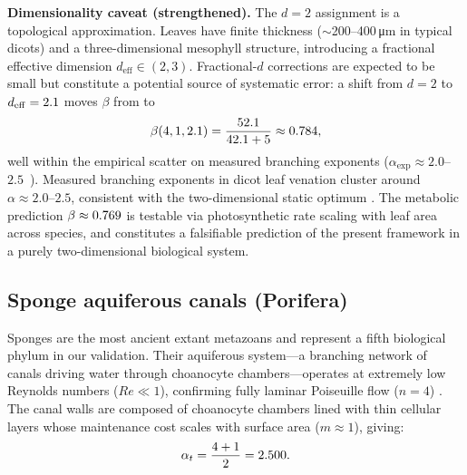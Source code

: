\documentclass[11pt,a4paper]{article}
\theoremstyle{remark}
\begin{document}
\noindent\textbf{Dimensionality caveat (strengthened).} The $d = 2$ assignment is a
topological approximation. Leaves have finite thickness
($\sim$200--400\,\si{\micro\metre} in typical dicots) and a
three-dimensional mesophyll structure, introducing a fractional effective
dimension $d_{\mathrm{eff}} \in (2, 3)$. Fractional-$d$ corrections are
expected to be small but constitute a potential source of systematic error:
a shift from $d = 2$ to $d_{\mathrm{eff}} = 2.1{}$ moves $\beta$ from
\betaLeaf{} to
\begin{equation}
\beta(4, 1, 2.1{}) = \frac{52.1{}}{42.1{} + 5}
\approx 0.784{},
\end{equation}
well within the empirical scatter on measured branching exponents
($\alpha_{\exp} \approx 2.0$--$2.5$~\cite{mcculloh2003}).
Measured branching exponents in dicot leaf venation cluster around $\alpha
\approx 2.0$--$2.5$, consistent with the two-dimensional static optimum
\cite{mcculloh2003}. The metabolic prediction $\beta \approx 0.769{}$ is
testable via photosynthetic rate scaling with leaf area across species, and
constitutes a falsifiable prediction of the present framework in a purely
two-dimensional biological system.

\subsection{Sponge aquiferous canals (Porifera)}
\label{sec:sponge}

Sponges are the most ancient extant metazoans and represent a fifth biological
phylum in our validation. Their aquiferous system---a branching network of
canals driving water through choanocyte chambers---operates at extremely low
Reynolds numbers ($Re \ll 1$), confirming fully laminar Poiseuille flow ($n=4$)
\cite{reiswig1975}. The canal walls are composed of choanocyte chambers lined
with thin cellular layers whose maintenance cost scales with surface area ($m
\approx 1$), giving:
\begin{equation*}
\alpha_t = \frac{4+1}{2} = 2.500{}.
\end{equation*}
\end{document}

